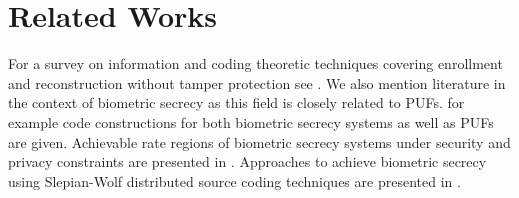 \section{Related Works}
For a survey on information and coding theoretic techniques covering enrollment and reconstruction without tamper protection see \cite{gunlu2020optimality}. We also mention literature in the context of biometric secrecy as this field is closely related to PUFs. \cite{gunlu2019code} for example code constructions for both biometric secrecy systems as well as PUFs are given. Achievable rate regions of biometric secrecy systems under security and privacy constraints are presented in \cite{ignatenko2009biometric}. Approaches to achieve biometric secrecy using Slepian-Wolf distributed source coding techniques are presented in \cite{vetro2009securing,draper2007using}.